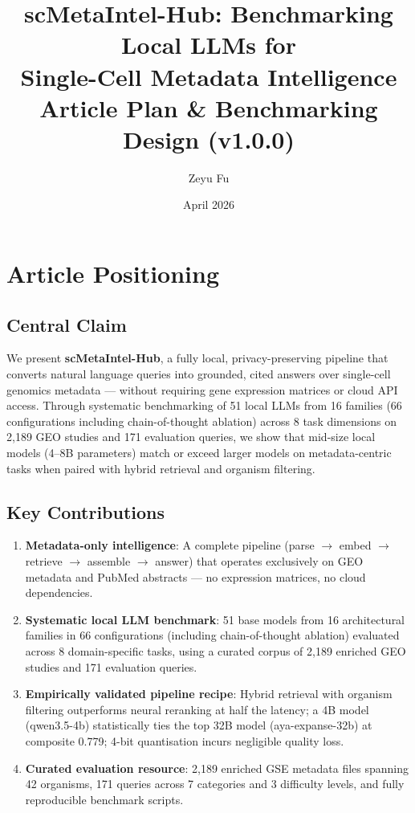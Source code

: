 \documentclass[11pt,a4paper]{article}
\title{%
  \textbf{scMetaIntel-Hub}: Benchmarking Local LLMs for \\
  Single-Cell Metadata Intelligence \\[6pt]
  \large Article Plan \& Benchmarking Design (v1.0.0)}
\author{Zeyu Fu}
\date{April 2026}
\begin{document}
\maketitle
\tableofcontents
\newpage

\section{Article Positioning}

\subsection{Central Claim}

We present \textbf{scMetaIntel-Hub}, a fully local, privacy-preserving
pipeline that converts natural language queries into grounded, cited answers
over single-cell genomics metadata --- without requiring gene expression
matrices or cloud API access. Through systematic benchmarking of 51 local
LLMs from 16 families (66 configurations including chain-of-thought
ablation) across 8 task dimensions on 2{,}189 GEO studies and 171 evaluation
queries, we show that mid-size local models (4--8B parameters) match or
exceed larger models on metadata-centric tasks when paired with hybrid
retrieval and organism filtering.

\subsection{Key Contributions}

\begin{enumerate}[leftmargin=2em]
  \item \textbf{Metadata-only intelligence}: A complete pipeline (parse
        $\to$ embed $\to$ retrieve $\to$ assemble $\to$ answer) that
        operates exclusively on GEO metadata and PubMed abstracts --- no
        expression matrices, no cloud dependencies.
  \item \textbf{Systematic local LLM benchmark}: 51 base models from 16
        architectural families in 66 configurations (including
        chain-of-thought ablation) evaluated across 8 domain-specific tasks,
        using a curated corpus of 2{,}189 enriched GEO studies and 171
        evaluation queries.
  \item \textbf{Empirically validated pipeline recipe}: Hybrid retrieval
        with organism filtering outperforms neural reranking at half the
        latency; a 4B model (qwen3.5-4b) statistically ties the top 32B
        model (aya-expanse-32b) at composite 0.779; 4-bit quantisation
        incurs negligible quality loss.
  \item \textbf{Curated evaluation resource}: 2{,}189 enriched GSE metadata
        files spanning 42 organisms, 171 queries across 7 categories and
        3 difficulty levels, and fully reproducible benchmark scripts.
\end{enumerate}
\end{document}
